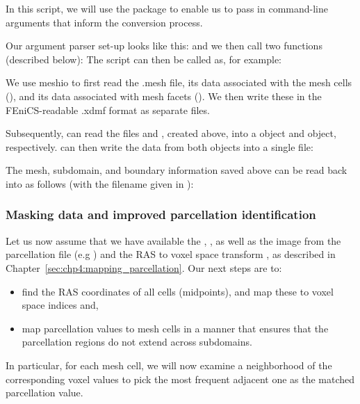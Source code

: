 In this script, we will use the  package to enable us to pass in 
command-line arguments that inform the conversion process.

\noindent Our argument parser set-up looks like this:
\noindent and we then  call two functions (described below): 
The script can then be called as, for example: 

We use meshio to first read the .mesh file, its data associated with
the mesh cells (), and its data associated with mesh
facets (). We then write these in the FEniCS-readable
.xdmf format as separate files.

Subsequently, {\fenics} can read the files  and , 
created above, into a  object and  
object, respectively. {\fenics} can then write the data from both objects 
into a single  file:

The mesh, subdomain, and boundary information saved above can be read 
back into {\fenics} as follows (with the filename 
given in ):

\subsubsection*{Masking data and improved parcellation identification}

Let us now assume that we have available the ,
, as well as the image  from the
parcellation file (e.g ) and the RAS to voxel space
transform , as described in
Chapter~\ref{sec:chp4:mapping_parcellation}. Our next steps are to:
\begin{itemize}
\item
  find the RAS coordinates of all cells (midpoints), and map these to
  voxel space indices and,
\item
  map parcellation values to mesh cells in a manner that ensures that the
  parcellation regions do not extend across subdomains.
\end{itemize}
In particular, for each mesh cell, we will now examine a neighborhood of the
corresponding voxel values to pick the most frequent adjacent one as
the matched parcellation value. 

